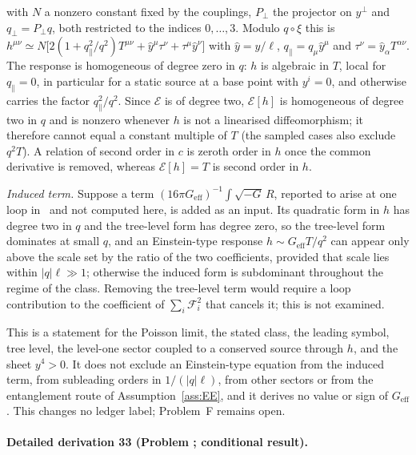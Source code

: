 with \(N\) a nonzero constant fixed by the couplings, \(P_\perp\) the projector on \(y^\perp\) and \(q_\perp=P_\perp q\), both restricted to the indices \(0,\dots,3\). Modulo \(q\circ\xi\) this is \(h^{\mu\nu}\simeq N\bigl[2(1+q_\parallel^2/q^2)T^{\mu\nu}+\hat y^\mu\tau^\nu+\tau^\mu\hat y^\nu\bigr]\) with \(\hat y=y/\ell\), \(q_\parallel=q_\mu\hat y^\mu\) and \(\tau^\nu=\hat y_\alpha T^{\alpha\nu}\). The response is homogeneous of degree zero in \(q\): \(h\) is algebraic in \(T\), local for \(q_\parallel=0\), in particular for a static source at a base point with \(y^i=0\), and otherwise carries the factor \(q_\parallel^2/q^2\). Since \(\mathcal E\) is of degree two, \(\mathcal E[h]\) is homogeneous of degree two in \(q\) and is nonzero whenever \(h\) is not a linearised diffeomorphism; it therefore cannot equal a constant multiple of \(T\) (the sampled cases also exclude \(q^2T\)). A relation of second order in \(c\) is zeroth order in \(h\) once the common derivative is removed, whereas \(\mathcal E[h]=T\) is second order in \(h\).



\emph{Induced term.} Suppose a term \((16\pi G_{\mathrm{eff}})^{-1}\int\sqrt{-G}\,R\), reported to arise at one loop in~\cite{Steinacker2023} and not computed here, is added as an input. Its quadratic form in \(h\) has degree two in \(q\) and the tree-level form has degree zero, so the tree-level form dominates at small \(q\), and an Einstein-type response \(h\sim G_{\mathrm{eff}}T/q^2\) can appear only above the scale set by the ratio of the two coefficients, provided that scale lies within \(|q|\ell\gg1\); otherwise the induced form is subdominant throughout the regime of the class. Removing the tree-level term would require a loop contribution to the coefficient of \(\sum_i\mathcal F_i^2\) that cancels it; this is not examined.



This is a statement for the Poisson limit, the stated class, the leading symbol, tree level, the level-one sector coupled to a conserved source through \(h\), and the sheet \(y^4>0\). It does not exclude an Einstein-type equation from the induced term, from subleading orders in \(1/(|q|\ell)\), from other sectors or from the entanglement route of Assumption~\ref{ass:EE}, and it derives no value or sign of \(G_{\mathrm{eff}}\). This changes no ledger label; Problem~F remains open.



\paragraph{Detailed derivation 33 (Problem ; conditional result).} \label{ref:detail-32} %



